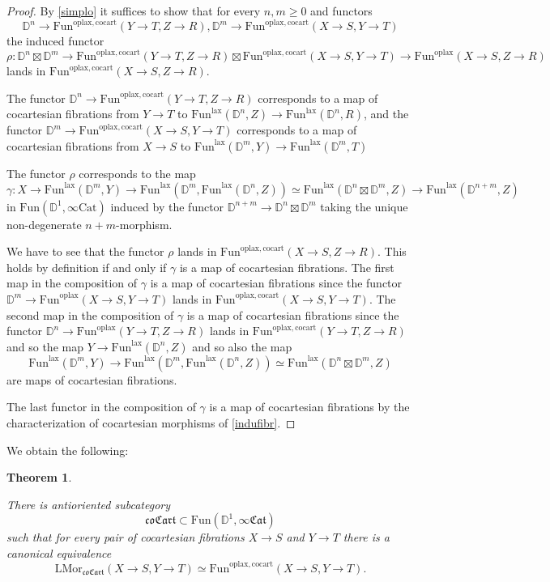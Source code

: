 \documentclass[10pt,oneside]{article}
\numberwithin{equation}{section} %
\numberwithin{figure}{section} %
\theoremstyle{plain}
\newtheorem{theorem}{Theorem}[subsection]
\theoremstyle{definition}
\newcommand{\bD}{{\mathbb D}}
\renewcommand{\L}{{\mathrm L}}
\newcommand{\Cat}{\mathrm{Cat}}
\newcommand{\Fun}{\mathrm{Fun}}
\newcommand{\cocart}{{\mathrm{cocart}}}
\newcommand{\lax}{{\mathrm{lax}}}
\newcommand{\oplax}{{\mathrm{oplax}}}
\newcommand{\Mor}{{\mathrm{Mor}}}
\begin{document}
\begin{proof}

By \cref{simplo} it suffices to show that for every $n,m \geq 0$
and functors $$\bD^n \to \Fun^{\oplax,\cocart}(Y\to T,Z \to R), \bD^m \to \Fun^{\oplax,\cocart}(X \to S,Y \to T)$$
the induced functor
$$\rho: \bD^n \boxtimes \bD^m \to \Fun^{\oplax,\cocart}(Y \to T, Z \to R) \boxtimes \Fun^{\oplax,\cocart}(X \to S, Y \to T) \to \Fun^{\oplax}(X \to S, Z \to R) $$
lands in $\Fun^{\oplax,\cocart}(X \to S, Z \to R).$

The functor $\bD^n \to \Fun^{\oplax,\cocart}(Y \to T, Z \to R)$ corresponds to a map of cocartesian fibrations from $Y \to T $ to $ \Fun^\lax(\bD^n,Z) \to \Fun^\lax(\bD^n,R) $,
and the functor $\bD^m \to \Fun^{\oplax,\cocart}(X \to S,Y \to T)$ corresponds to a map of cocartesian fibrations from $X \to S $ to $ \Fun^\lax(\bD^m,Y) \to \Fun^\lax(\bD^m,T) $

The functor $\rho$ corresponds to the map
$$\gamma: X \to \Fun^\lax(\bD^m,Y) \to\Fun^\lax(\bD^m,\Fun^\lax(\bD^n,Z)) \simeq \Fun^\lax(\bD^n \boxtimes \bD^m, Z) \to \Fun^\lax(\bD^{n+m},Z) $$
in $\Fun(\bD^1, \infty\Cat)$
induced by the functor $\bD^{n+m} \to \bD^n \boxtimes \bD^m$ taking the unique non-degenerate $n+m$-morphism.

We have to see that the functor $\rho$ lands in $\Fun^{\oplax, \cocart}(X \to S, Z\to R).$ This holds by definition if and only if 
$\gamma$ is a map of cocartesian fibrations.
The first map in the composition of $\gamma$ is a map of cocartesian fibrations since the functor $\bD^m \to \Fun^{\oplax}(X \to S,Y \to T)$ lands in $\Fun^{\oplax,\cocart}(X \to S,Y \to T)$.
The second map in the composition of $\gamma$ is a map of cocartesian fibrations since the functor $\bD^n \to \Fun^{\oplax}(Y \to T, Z\to R)$ lands in $\Fun^{\oplax,\cocart}(Y \to T, Z \to R)$
and so the map $Y \to \Fun^\lax(\bD^n,Z) $ and so also the map $$\Fun^\lax(\bD^m,Y) \to \Fun^\lax(\bD^m,\Fun^\lax(\bD^n,Z)) \simeq \Fun^\lax(\bD^n \boxtimes \bD^m, Z) $$ are maps of cocartesian fibrations.

The last functor in the composition of $\gamma$ is a map of cocartesian fibrations by the characterization of cocartesian morphisms of \cref{indufibr}.
\end{proof}

We obtain the following:

\begin{theorem}\label{orienfib}

There is antioriented subcategory 
$$ \mathfrak{coCart} \subset \Fun(\bD^1, \infty\mathfrak{Cat})$$
such that for every pair of cocartesian fibrations $X \to S$ and $Y \to T$
there is a canonical equivalence
$$ \L\Mor_{\mathfrak{coCart}}(X \to S, Y\to T) \simeq \Fun^{\oplax,\cocart}(X \to S, Y\to T).$$

\end{theorem}
\end{document}
